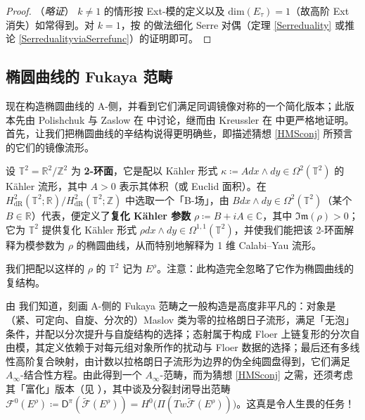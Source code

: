 \begin{proof}（\textit{略证}）
	$k\neq 1$ 的情形按 Ext-模的定义以及 $\text{dim}(E_\tau)=1$（故高阶 Ext 消失）如常得到。对 $k=1$，按 \cite[引理 2.7]{[Kre00]} 的做法细化 Serre 对偶（定理 \ref{Serreduality} 或推论 \ref{SerredualityviaSerrefunc}）的证明即可。
\end{proof}



\subsection{椭圆曲线的 Fukaya 范畴}\label{ch7.2}


现在构造椭圆曲线的 A-侧，并看到它们满足同调镜像对称的一个简化版本；此版本先由 Polishchuk 与 Zaslow 在 \cite{[PZ00]} 中讨论，继而由 Kreussler 在 \cite{[Kre00]} 中更严格地证明。首先，让我们把椭圆曲线的辛结构说得更明确些，即描述猜想 \ref{HMSconj} 所预言的它们的镜像流形。

\begin{Def}\label{2torus}
	设 $\mathbb{T}^2=\mathbb{R}^2/\mathbb{Z}^2$ 为 \textbf{2-环面}，它是配以 Kähler 形式 $\kappa\coloneqq Adx\wedge dy\in\Omega^2(\mathbb{T}^2)$ 的 Kähler 流形，其中 $A>0$ 表示其体积（或 Euclid 面积）。在 $H^2_\text{dR}(\mathbb{T}^2;\mathbb{R})/H^2_\text{dR}(\mathbb{T}^2;\mathbb{Z})$ 中选取一个「B-场」，由 $Bdx\wedge dy\in\Omega^2(\mathbb{T}^2)$（某个 $B\in\mathbb{R}$）代表，便定义了\textbf{复化 Kähler 参数} $\rho\coloneqq B+iA\in\mathbb{C}$，其中 $\mathfrak{Im}(\rho)>0$；它为 $\mathbb{T}^2$ 提供复化 Kähler 形式 $\rho dx\wedge dy\in\Omega^{1,1}(\mathbb{T}^2)$，并使我们能把该 2-环面解释为模参数为 $\rho$ 的椭圆曲线，从而特别地解释为 1 维 Calabi--Yau 流形。

	我们把配以这样的 $\rho$ 的 $\mathbb{T}^2$ 记为 $E^\rho$。注意：此构造完全忽略了它作为椭圆曲线的复结构。
\end{Def}

由 \cite[定义 6.13]{[Imp21]} 我们知道，刻画 A-侧的 Fukaya 范畴之一般构造是高度非平凡的：对象是（紧、可定向、自旋、分次的）Maslov 类为零的拉格朗日子流形，满足「无泡」条件，并配以分次提升与自旋结构的选择；态射属于构成 Floer 上链复形的分次自由模，其定义依赖于对每元组对象所作的扰动与 Floer 数据的选择；最后还有多线性高阶复合映射，由计数以拉格朗日子流形为边界的伪全纯圆盘得到，它们满足 $A_\infty$-结合性方程。由此得到一个 $A_\infty$-范畴，而为猜想 \ref{HMSconj} 之需，还须考虑其「富化」版本（见 \cite[定义 7.25]{[Imp21]}），其中谈及分裂封闭导出范畴 $\mathscr{F}^0(E^\rho)\coloneqq\mathsf{D}^\pi(\widetilde{\mathscr{F}}(E^\rho))=H^0\big(\Pi(Tw\widetilde{\mathscr{F}}(E^\rho))\big)$。这真是令人生畏的任务！

